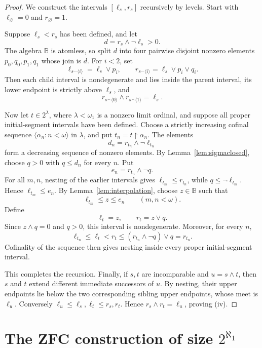 \documentclass[11pt]{article}
\theoremstyle{definition}
\theoremstyle{remark}
\newcommand{\B}{\mathbb B}
\newcommand{\restr}{\mathbin{\upharpoonright}}
\newcommand{\concat}{\mathbin{{}^\frown}}
\begin{document}
\begin{proof}
We construct the intervals \([\ell_s,r_s]\) recursively by levels.  Start
with \(\ell_\varnothing=0\) and \(r_\varnothing=1\).

Suppose \(\ell_s<r_s\) has been defined, and let
\[
  d=r_s\wedge\neg\ell_s>0.
\]
The algebra \(\B\) is atomless, so split \(d\) into four pairwise disjoint
nonzero elements
\(p_0,q_0,p_1,q_1\) whose join is \(d\).  For \(i<2\), set
\[
  \ell_{s\concat\langle i\rangle}=\ell_s\vee p_i,
  \qquad
  r_{s\concat\langle i\rangle}=\ell_s\vee p_i\vee q_i.
\]
Then each child interval is nondegenerate and lies inside the parent interval,
its lower endpoint is strictly above \(\ell_s\), and
\[
  r_{s\concat\langle0\rangle}
  \wedge r_{s\concat\langle1\rangle}=\ell_s.
\]

Now let \(t\in2^\lambda\), where \(\lambda<\omega_1\) is a nonzero limit
ordinal, and suppose all proper initial-segment intervals have been defined.
Choose a strictly increasing cofinal sequence
\(\langle\alpha_n:n<\omega\rangle\) in \(\lambda\), and put
\(t_n=t\restr\alpha_n\).  The elements
\[
  d_n=r_{t_n}\wedge\neg\ell_{t_n}
\]
form a decreasing sequence of nonzero elements.  By
Lemma~\ref{lem:sigmaclosed}, choose \(q>0\) with \(q\leq d_n\) for every
\(n\).  Put
\[
  e_n=r_{t_n}\wedge\neg q.
\]
For all \(m,n\), nesting of the earlier intervals gives
\(\ell_{t_m}\leq r_{t_n}\), while \(q\leq\neg\ell_{t_m}\).  Hence
\(\ell_{t_m}\leq e_n\).  By Lemma~\ref{lem:interpolation}, choose
\(z\in\B\) such that
\[
  \ell_{t_m}\leq z\leq e_n
  \qquad(m,n<\omega).
\]
Define
\[
  \ell_t=z,
  \qquad
  r_t=z\vee q.
\]
Since \(z\wedge q=0\) and \(q>0\), this interval is nondegenerate.  Moreover,
for every \(n\),
\[
  \ell_{t_n}\leq\ell_t<r_t
  \leq (r_{t_n}\wedge\neg q)\vee q=r_{t_n}.
\]
Cofinality of the sequence then gives nesting inside every proper
initial-segment interval.

This completes the recursion.  Finally, if \(s,t\) are incomparable and
\(u=s\wedge t\), then \(s\) and \(t\) extend different immediate successors
of \(u\).  By nesting, their upper endpoints lie below the two corresponding
sibling upper endpoints, whose meet is \(\ell_u\).  Conversely
\(\ell_u\leq\ell_s,\ell_t\leq r_s,r_t\).  Hence
\(r_s\wedge r_t=\ell_u\), proving (iv).
\end{proof}

\section{The ZFC construction of size \(2^{\aleph_1}\)}
\end{document}
